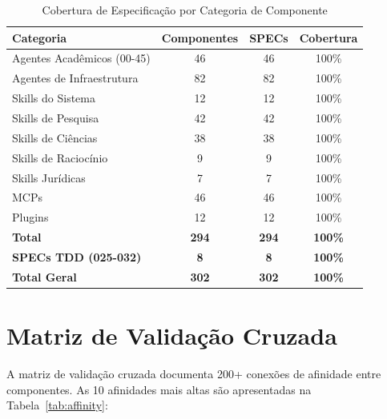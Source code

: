 \begin{table}[H]
\centering
\caption{Cobertura de Especificação por Categoria de Componente}
\label{tab:spec-coverage}
\begin{tabular}{p{4cm}ccc}
\toprule
\textbf{Categoria} & \textbf{Componentes} & \textbf{SPECs} & \textbf{Cobertura} \\
\midrule
Agentes Acadêmicos (00-45) & 46 & 46 & 100\% \\
Agentes de Infraestrutura & 82 & 82 & 100\% \\
Skills do Sistema & 12 & 12 & 100\% \\
Skills de Pesquisa & 42 & 42 & 100\% \\
Skills de Ciências & 38 & 38 & 100\% \\
Skills de Raciocínio & 9 & 9 & 100\% \\
Skills Jurídicas & 7 & 7 & 100\% \\
MCPs & 46 & 46 & 100\% \\
Plugins & 12 & 12 & 100\% \\
\addlinespace
\textbf{Total} & \textbf{294} & \textbf{294} & \textbf{100\%} \\
\addlinespace
\textbf{SPECs TDD (025-032)} & \textbf{8} & \textbf{8} & \textbf{100\%} \\
\addlinespace
\textbf{Total Geral} & \textbf{302} & \textbf{302} & \textbf{100\%} \\
\bottomrule
\end{tabular}
\end{table}

\section{Matriz de Validação Cruzada}

A matriz de validação cruzada documenta 200+ conexões de afinidade entre componentes. As 10 afinidades mais altas são apresentadas na Tabela~\ref{tab:affinity}:


